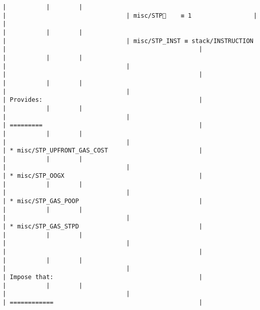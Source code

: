 \documentclass[varwidth=\maxdimen,margin=0.5cm,multi={verbatim}]{standalone}
\begin{document}
\begin{verbatim}
|           |        |                                                                     |                                 | misc/STP🚩    ≡ 1                 |                                                     |
|           |        |                                                                     |                                 | misc/STP_INST ≡ stack/INSTRUCTION |                                                     |
|           |        |                                                                     |                                 |                                   |                                                     |
|           |        |                                                                     |                                 |                                   | Provides:                                           |
|           |        |                                                                     |                                 |                                   | =========                                           |
|           |        |                                                                     |                                 |                                   | * misc/STP_UPFRONT_GAS_COST                         |
|           |        |                                                                     |                                 |                                   | * misc/STP_OOGX                                     |
|           |        |                                                                     |                                 |                                   | * misc/STP_GAS_POOP                                 |
|           |        |                                                                     |                                 |                                   | * misc/STP_GAS_STPD                                 |
|           |        |                                                                     |                                 |                                   |                                                     |
|           |        |                                                                     |                                 |                                   | Impose that:                                        |
|           |        |                                                                     |                                 |                                   | ============                                        |

\end{verbatim}
\end{document}
